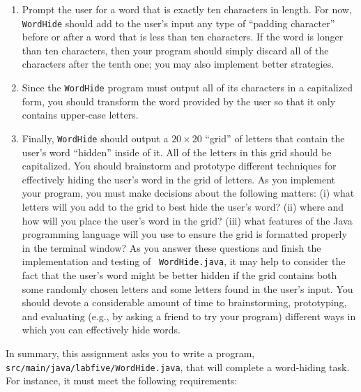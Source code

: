 \documentclass[11pt]{article}
\newcommand{\mainprogramsource}{\lstinline{src/main/java/labfive/WordHide.java}}
\begin{document}
\vspace*{-.1in}

\begin{enumerate}

  \itemsep0in

  \item Prompt the user for a word that is exactly ten characters in length. For
    now, {\tt WordHide} should add to the user's input any type of ``padding
    character'' before or after a word that is less than ten characters. If the
    word is longer than ten characters, then your program should simply discard
    all of the characters after the tenth one; you may also implement better
    strategies.

  \item Since the {\tt WordHide} program must output all of its characters in a
    capitalized form, you should transform the word provided by the user so that
    it only contains upper-case letters.

  \item Finally, {\tt WordHide} should output a $20 \times 20$ ``grid'' of
    letters that contain the user's word ``hidden'' inside of it. All of the
    letters in this grid should be capitalized. You should brainstorm and
    prototype different techniques for effectively hiding the user's word in the
    grid of letters. As you implement your program, you must make decisions
    about the following matters: (i) what letters will you add to the grid to
    best hide the user's word? (ii) where and how will you place the user's word
    in the grid? (iii) what features of the Java programming language will you
    use to ensure the grid is formatted properly in the terminal window? As you
    answer these questions and finish the implementation and testing of {\tt
    WordHide.java}, it may help to consider the fact that the user's word might
    be better hidden if the grid contains both some randomly chosen letters and
    some letters found in the user's input. You should devote a considerable
    amount of time to brainstorming, prototyping, and evaluating (e.g., by
    asking a friend to try your program) different ways in which you can
    effectively hide words.

\end{enumerate}

\vspace*{-.1in}

In summary, this assignment asks you to write a program, \mainprogramsource{},
that will complete a word-hiding task. For instance, it must meet the following
requirements:
\end{document}
